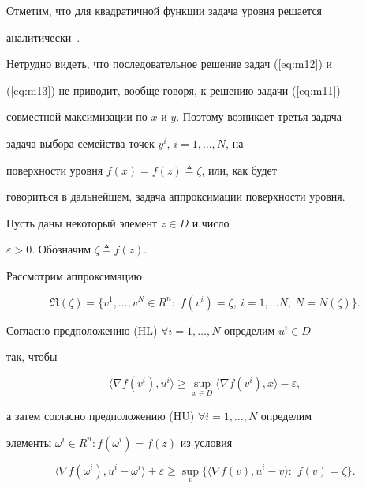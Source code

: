 Отметим, что для квадратичной функции задача уровня решается


аналитически~\cite{l7}.





Нетрудно видеть, что последовательное решение задач (\ref{eq:m12}) и 


(\ref{eq:m13}) не приводит, вообще говоря, к решению задачи (\ref{eq:m11})


совместной максимизации по $x$ и $y$. Поэтому возникает третья задача ---


задача выбора семейства точек $y^{i}$, $i=1,\dotsc,N$, на 


поверхности уровня $f(x)=f(z)\triangleq\zeta $, или, как будет


говориться в дальнейшем, задача аппроксимации поверхности уровня.





Пусть даны некоторый элемент $z\in D$ и число


$\varepsilon >0$. Обозначим $\zeta\triangleq f(z)$.


Рассмотрим аппроксимацию


\begin{equation}


\Re (\zeta)=\{ v^{1},\dotsc,v^{N} \in R^{n} : \, \,


f(v^{i})=\zeta,\ i=1,\dotsc N, \ N=N(\zeta) \}. 


\label{eq:m14}


\end{equation}


Согласно предположению (HL) $ \forall i=1,\dotsc,N$ определим $u^{i} \in D$


так, чтобы


\begin{equation}


\langle \nabla f(v^{i}),u^{i}\rangle \geq


\sup_{x\in D} \langle \nabla f(v^{i}),x \rangle - \varepsilon,


\label{eq:m15}


\end{equation}


а затем согласно предположению (HU) $\forall i=1,\dotsc,N$ определим 


элементы $\omega^{i} \in R^{n} : f(\omega^{i})=f(z)$ из условия


\begin{equation}


\langle \nabla f(\omega^{i}),u^{i}-\omega^{i} \rangle + \varepsilon \geq


\sup_{v}\{ \langle \nabla f(v),u^{i}-v \rangle :\,\, f(v)=\zeta \}.


\label{eq:m16}


\end{equation}





